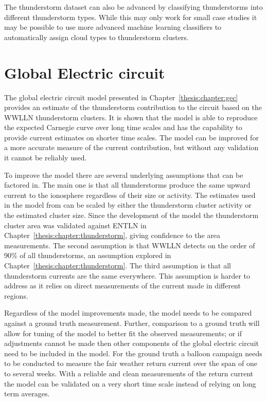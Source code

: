 The thunderstorm dataset can also be advanced by classifying thunderstorms into different thunderstorm types.
While this may only work for small case studies it may be possible to use more advanced machine learning classifiers to automatically assign cloud types to thunderstorm clusters.

\section{Global Electric circuit}

The global electric circuit model presented in Chapter~\ref{thesis:chapter:gec} provides an estimate of the thunderstorm contribution to the circuit based on the WWLLN thunderstorm clusters.
It is shown that the model is able to reproduce the expected Carnegie curve over long time scales and has the capability to provide current estimates on shorter time scales.
The model can be improved for a more accurate measure of the current contribution, but without any validation it cannot be reliably used.

To improve the model there are several underlying assumptions that can be factored in.
The main one is that all thunderstorms produce the same upward current to the ionosphere regardless of their size or activity.
The estimates used in the model from \citet{Mach2010} can be scaled by either the thunderstorm cluster activity or the estimated cluster size.
Since the development of the model the thunderstorm cluster area was validated against ENTLN in Chapter~\ref{thesis:chapter:thunderstorm}, giving confidence to the area measurements.
The second assumption is that WWLLN detects on the order of 90\% of all thunderstorms, an assumption explored in Chapter~\ref{thesis:chapter:thunderstorm}.
The third assumption is that all thunderstorm currents are the same everywhere.
This assumption is harder to address as it relies on direct measurements of the current made in different regions.

Regardless of the model improvements made, the model needs to be compared against a ground truth measurement.
Further, comparison to a ground truth will allow for tuning of the model to better fit the observed measurements; or if adjustments cannot be made then other components of the global electric circuit need to be included in the model.
For the ground truth a balloon campaign needs to be conducted to measure the fair weather return current over the span of one to several weeks.
With a reliable and clean measurements of the return current the model can be validated on a very short time scale instead of relying on long term averages.

